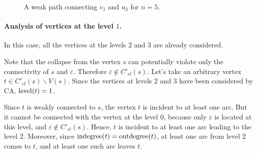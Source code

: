 \begin{figure}[ht]
\begin{center}

\end{center}

\caption{A weak path connecting $v_1$ and $u_2$ for $n=5$.}\label{fig:lvl2n5pathvu}
\end{figure}

\paragraph{Analysis of vertices at the level \texorpdfstring{$1$}{1}.}

In this case, all the vertices at the levels $ 2 $ and $ 3 $ are already considered.

Note that the collapse from the vertex $ s $ can potentially violate only the connectivity of $ s $ and $ \varepsilon $. Therefore $ \varepsilon \notin C'_{cl} (s) $. Let's take an arbitrary vertex $ t \in C'_{cl}(s) \backslash V(s)$. Since the vertices at levels $2$ and $3$ have been considered by CA, $ \operatorname{level} (t) = 1 $.

Since $t$ is weakly connected to $s$, the vertex $ t $ is incident to at least one arc. But it cannot be connected with the vertex at the level $ 0 $, because only $ \varepsilon $ is located at this level, and $ \varepsilon \notin C'_{cl} (s) $. Hence, $ t $ is incident to at least one arc leading to the level $ 2 $. Moreover, since $ \operatorname{indegree}(t)=\operatorname{outdegree}(t)$, at least one arc from level $2$ comes to $ t $, and at least one such arc leaves $ t $.

